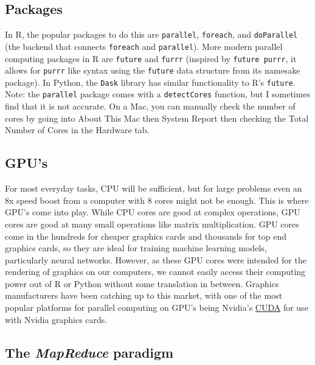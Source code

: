 \documentclass[
]{book}
\begin{document}
\hypertarget{packages}{%
\subsection{Packages}\label{packages}}

In R, the popular packages to do this are \texttt{parallel}, \texttt{foreach}, and \texttt{doParallel} (the backend that connects \texttt{foreach} and \texttt{parallel}). More modern parallel computing packages in R are \texttt{future} and \texttt{furrr} (inspired by \texttt{future\ purrr}, it allows for \texttt{purrr} like syntax using the \texttt{future} data structure from its namesake package). In Python, the \texttt{Dask} library has similar functionality to R's \texttt{future}. Note: the \texttt{parallel} package comes with a \texttt{detectCores} function, but I sometimes find that it is not accurate. On a Mac, you can manually check the number of cores by going into About This Mac then System Report then checking the Total Number of Cores in the Hardware tab.

\hypertarget{gpus}{%
\subsection{GPU's}\label{gpus}}

For most everyday tasks, CPU will be sufficient, but for large problems even an 8x speed boost from a computer with 8 cores might not be enough. This is where GPU's come into play. While CPU cores are good at complex operations, GPU cores are good at many small operations like matrix multiplication. GPU cores come in the hundreds for cheaper graphics cards and thousands for top end graphics cards, so they are ideal for training machine learning models, particularly neural networks. However, as these GPU cores were intended for the rendering of graphics on our computers, we cannot easily access their computing power out of R or Python without some translation in between. Graphics manufacturers have been catching up to this market, with one of the most popular platforms for parallel computing on GPU's being Nvidia's \href{https://developer.nvidia.com/cuda-zone}{CUDA} for use with Nvidia graphics cards.

\hypertarget{the-mapreduce-paradigm}{%
\subsection{\texorpdfstring{The \emph{MapReduce} paradigm}{The MapReduce paradigm}}\label{the-mapreduce-paradigm}}
\end{document}
